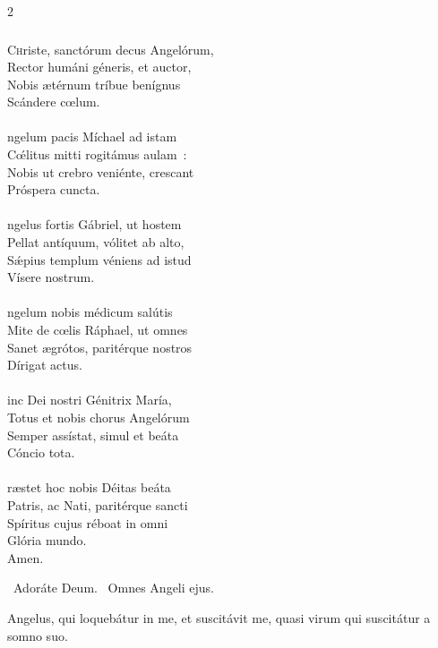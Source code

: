 \documentclass[9pt,twoside]{extarticle}
\begin{document}
\begin{multicols}{2}
{{{\subsubsection*{\center {}}
\lettrine{C}hriste, sanctórum decus Angelórum,\\
Rector humáni géneris, et auctor,\\
Nobis ætérnum tríbue benígnus\\
Scándere cœlum.\\
\\
ngelum pacis Míchael ad istam\\
Cœ́litus mitti rogitámus aulam~:\\
Nobis ut crebro veniénte, crescant\\
Próspera cuncta.\\
\\
ngelus fortis Gábriel, ut hostem\\
Pellat antíquum, vólitet ab alto,\\
Sǽpius templum véniens ad istud\\
Vísere nostrum.\\
\\
ngelum nobis médicum salútis\\
Mite de cœlis Ráphael, ut omnes\\
Sanet ægrótos, paritérque nostros\\
Dírigat actus.\\
\\
inc Dei nostri Génitrix María,\\
Totus et nobis chorus Angelórum\\
Semper assístat, simul et beáta\\
Cóncio tota.\\
\\
ræstet hoc nobis Déitas beáta\\
Patris, ac Nati, paritérque sancti\\
Spíritus cujus réboat in omni\\
Glória mundo.\\
Amen.

\begin{tightlist}{}
\item {}~Adoráte Deum. ~Omnes Angeli ejus.
\item {} Angelus, qui loquebátur in me, et suscitávit me, quasi virum qui suscitátur a somno suo.
\end{tightlist}

}}}
\end{multicols}
\end{document}
